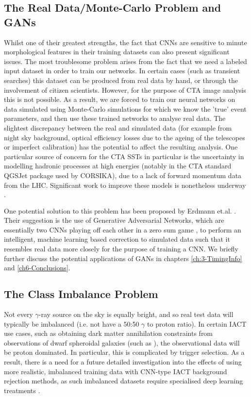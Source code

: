 \subsection{The Real Data/Monte-Carlo Problem and GANs}
Whilst one of their greatest strengths, the fact that CNNs are sensitive to minute morphological features in their training datasets can also present significant issues. The most troublesome problem arises from the fact that we need a labeled input dataset in order to train our networks. In certain cases (such as transient searches\cite{SNH}) this dataset can be produced from real data by hand, or through the involvement of citizen scientists. However, for the purpose of CTA image analysis this is not possible. As a result, we are forced to train our neural networks on data simulated using Monte-Carlo simulations for which we know the 'true' event parameters, and then use these trained networks to analyse real data. The slightest discrepancy between the real and simulated data (for example from night sky background, optical efficiency losses due to the ageing of the telescopes or imperfect calibration) has the potential to affect the resulting analysis. One particular source of concern for the CTA SSTs in particular is the uncertainty in modelling hadronic processes at high energies (notably in the CTA standard QGSJet package used by CORSIKA), due to a lack of forward momentum data from the LHC. Significant work to improve these models is nonetheless underway \cite{hadronmodel}.

One potential solution to this problem has been proposed by Erdmann et.al. \cite{ErdmannAuger}. Their suggestion is the use of Generative Adversarial Networks, which are essentially two CNNs playing off each other in a zero sum game \cite{goodfellow2016deep}, to perform an intelligent, machine learning based correction to simulated data such that it resembles real data more closely for the purpose of training a CNN. We briefly further discuss the potential applications of GANs in chapters \ref{ch:3-TimingInfo} and \ref{ch6-Conclusions}.

\subsection{The Class Imbalance Problem}

Not every $\gamma$-ray source on the sky is equally bright, and so real test data will typically be imbalanced (i.e. not have a 50:50 $\gamma$ to proton ratio). In certain IACT use cases, such as obtaining dark matter annihilation constraints from observations of dwarf spheroidal galaxies (such as \cite{gloryduck}), the observational data will be proton dominated. In particular, this is complicated by trigger selection. As a result, there is a need for a future detailed investigation into the effects of using more realistic, imbalanced training data with CNN-type IACT background rejection methods, as such imbalanced datasets require specialised deep learning treatments \cite{imbalance}.


